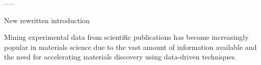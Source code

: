 










-----


New rewritten introduction 


Mining experimental data from scientific publications has become increasingly popular in materials science due to the vast amount of information available and the need for accelerating materials discovery using data-driven techniques.



